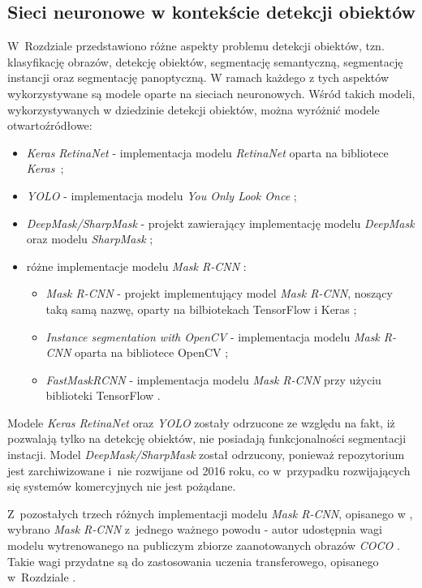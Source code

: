 \subsection{Sieci neuronowe w kontekście detekcji obiektów}

W~Rozdziale  przedstawiono różne aspekty problemu detekcji obiektów, tzn. klasyfikację obrazów, detekcję obiektów, segmentację semantyczną, segmentację instancji oraz segmentację panoptyczną. W ramach każdego z tych aspektów wykorzystywane są modele oparte na sieciach neuronowych. Wśród takich modeli, wykorzystywanych w dziedzinie detekcji obiektów, można wyróżnić modele otwartoźródłowe:

\begin{itemize}
	\item \textit{Keras RetinaNet} \cite{keras-retinanet-implementation} - implementacja modelu \textit{RetinaNet} \cite{keras-retinanet} oparta na bibliotece \textit{Keras}~\cite{keras};
	\item \textit{YOLO} \cite{yolo-implementation} - implementacja modelu \textit{You Only Look Once} \cite{yolo};
	\item \textit{DeepMask/SharpMask} \cite{deep-sharp-mask} - projekt zawierający implementację modelu \textit{DeepMask} \cite{deepmask} oraz modelu \textit{SharpMask} \cite{sharpmask};
	\item różne implementacje modelu \textit{Mask R-CNN} \cite{general-mask-rcnn}:
		\begin{itemize}
			\item \textit{Mask R-CNN} \cite{matterport-mask-rcnn} - projekt implementujący model \textit{Mask R-CNN}, noszący taką samą nazwę, oparty na bilbiotekach TensorFlow \cite{tensorflow} i Keras \cite{keras};
			\item \textit{Instance segmentation with OpenCV} \cite{mask-rcnn-opencv} - implementacja modelu \textit{Mask R-CNN} oparta na bibliotece OpenCV \cite{opencv};
			\item \textit{FastMaskRCNN} \cite{fast-mask-rcnn} - implementacja modelu \textit{Mask R-CNN} przy użyciu biblioteki TensorFlow \cite{tensorflow}.
		\end{itemize}
\end{itemize}

Modele \textit{Keras RetinaNet} oraz \textit{YOLO} zostały odrzucone ze względu na fakt, iż pozwalają tylko na detekcję obiektów, nie posiadają funkcjonalności segmentacji instacji.
Model \textit{DeepMask/SharpMask} został odrzucony, ponieważ repozytorium jest zarchiwizowane i~nie rozwijane od 2016 roku, co w~przypadku rozwijających się systemów komercyjnych nie jest pożądane.

Z~pozostałych trzech różnych implementacji modelu \textit{Mask R-CNN}, opisanego w \cite{general-mask-rcnn}, wybrano \textit{Mask R-CNN} \cite{matterport-mask-rcnn} z~jednego ważnego powodu - autor udostępnia wagi modelu wytrenowanego na publiczym zbiorze zaanotowanych obrazów \textit{COCO} \cite{coco}. Takie wagi przydatne są do zastosowania uczenia transferowego, opisanego w~Rozdziale .
